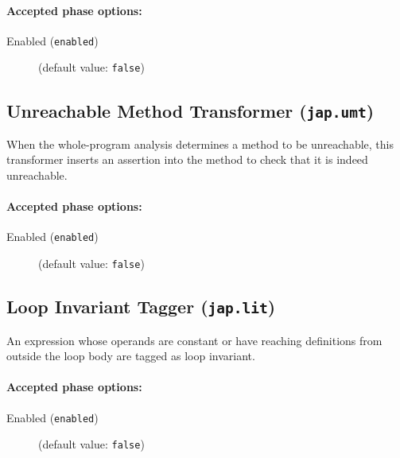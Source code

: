 \documentclass{article}
\begin{document}
\paragraph{Accepted phase options:} 

\begin{description}

\item[Enabled ({\tt enabled})]
(default value: {\tt false})






\end{description}

\subsection{Unreachable Method Transformer ({\tt jap.umt})}
When the whole-program analysis determines a method to be unreachable, this transformer inserts an assertion into the method to check that it is indeed unreachable.

\paragraph{Accepted phase options:} 

\begin{description}

\item[Enabled ({\tt enabled})]
(default value: {\tt false})






\end{description}

\subsection{Loop Invariant Tagger ({\tt jap.lit})}
An expression whose operands are constant or have reaching definitions from outside the loop body are tagged as loop invariant.

\paragraph{Accepted phase options:} 

\begin{description}

\item[Enabled ({\tt enabled})]
(default value: {\tt false})






\end{description}
\end{document}
